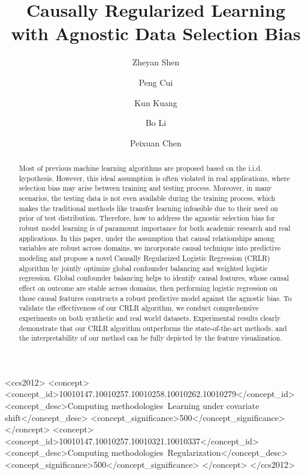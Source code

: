 \documentclass[sigconf]{acmart}
\begin{document}
\title{Causally Regularized Learning with Agnostic Data Selection Bias}

\author{Zheyan Shen}

\author{Peng Cui}

\author{Kun Kuang}

\author{Bo Li}

\author{Peixuan Chen}

\renewcommand{\shortauthors}{Z. Shen et al.}

\begin{abstract}
Most of previous machine learning algorithms are proposed based on the i.i.d. hypothesis.
However, this ideal assumption is often violated in real applications, where selection bias may arise between training and testing process.
Moreover, in many scenarios, the testing data is not even available during the training process, which makes the traditional methods like transfer learning infeasible due to their need on prior of test distribution.
Therefore, how to address the agnostic selection bias for robust model learning is of paramount importance for both academic research and real applications.
In this paper, under the assumption that causal relationships among variables are robust across domains, we incorporate causal technique into predictive modeling and propose a novel Causally Regularized Logistic Regression (CRLR) algorithm by jointly optimize global confounder balancing and weighted logistic regression.
Global confounder balancing helps to identify causal features, whose causal effect on outcome are stable across domains, then performing logistic regression on those causal features constructs a robust predictive model against the agnostic bias.
To validate the effectiveness of our CRLR algorithm, we conduct comprehensive experiments on both synthetic and real world datasets.
Experimental results clearly demonstrate that our CRLR algorithm outperforms the state-of-the-art methods, and the interpretability of our method can be fully depicted by the feature visualization.
\end{abstract}

\begin{CCSXML}
<ccs2012>
<concept>
<concept_id>10010147.10010257.10010258.10010262.10010279</concept_id>
<concept_desc>Computing methodologies~Learning under covariate shift</concept_desc>
<concept_significance>500</concept_significance>
</concept>
<concept>
<concept_id>10010147.10010257.10010321.10010337</concept_id>
<concept_desc>Computing methodologies~Regularization</concept_desc>
<concept_significance>500</concept_significance>
</concept>
</ccs2012>
\end{CCSXML}
\end{document}
